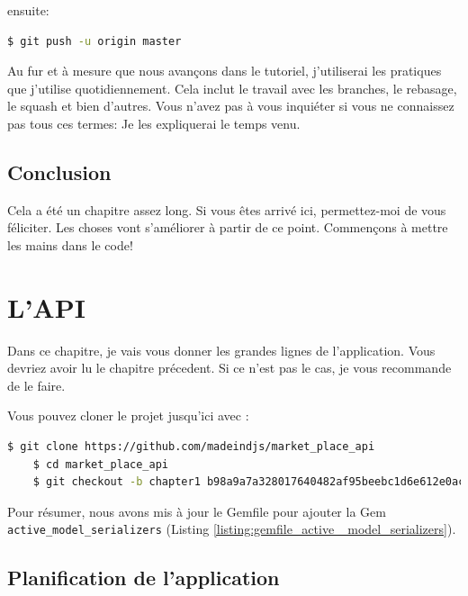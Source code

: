 \documentclass[]{report}
\begin{document}
    ensuite:

    \begin{scriptsize}
      \begin{lstlisting}[language=bash]
      $ git push -u origin master
      \end{lstlisting}
    \end{scriptsize}

    Au fur et à mesure que nous avançons dans le tutoriel, j'utiliserai les pratiques que j'utilise quotidiennement. Cela inclut le travail avec les branches, le rebasage, le squash et bien d'autres. Vous n'avez pas à vous inquiéter si vous ne connaissez pas tous ces termes: Je les expliquerai le temps venu.

  \section{Conclusion}

    Cela a été un chapitre assez long. Si vous êtes arrivé ici, permettez-moi de vous féliciter. Les choses vont s'améliorer à partir de ce point. Commençons à mettre les mains dans le code!

\chapter{L'API}\label{chapter:2}

  Dans ce chapitre, je vais vous donner les grandes lignes de l'application. Vous devriez avoir lu le chapitre précedent. Si ce n'est pas le cas, je vous recommande de le faire.

  Vous pouvez cloner le projet jusqu'ici avec :

  \begin{scriptsize}
    \begin{lstlisting}[language=bash]
    $ git clone https://github.com/madeindjs/market_place_api
    $ cd market_place_api
    $ git checkout -b chapter1 b98a9a7a328017640482af95beebc1d6e612e0ac
    \end{lstlisting}
  \end{scriptsize}

  Pour résumer, nous avons mis à jour le Gemfile pour ajouter la Gem \verb|active_model_serializers| (Listing \ref{listing:gemfile_active _model_serializers}).

  \section{Planification de l'application}
\end{document}
